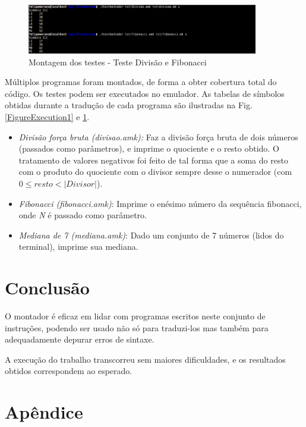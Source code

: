 \documentclass[12pt, a4paper]{article}
\begin{document}
\begin{figure}
\centering
\includegraphics[width=0.9\textwidth]{RuntimeScreencap2.png}
\caption{Montagem dos testes - Teste Divisão e Fibonacci}
\label{FigureExecution2}
\end{figure}

Múltiplos programas foram montados, de forma a obter cobertura total do código. Os testes podem ser executados no emulador. As tabelas de símbolos obtidas durante a tradução de cada programa são ilustradas na Fig. \ref{FigureExecution1} e \ref{FigureExecution2}.

\begin{itemize}
	\item \emph{Divisão força bruta (divisao.amk):} Faz a divisão força bruta de dois números (passados como parâmetros), e imprime o quociente e o resto obtido. O tratamento de valores negativos foi feito de tal forma que a soma do resto com o produto do quociente com o divisor sempre desse o numerador (com $0 \leq resto < |Divisor|$).
	\item \emph{Fibonacci (fibonacci.amk)}: Imprime o enésimo número da sequência fibonacci, onde \emph{N} é passado como parâmetro.
	\item \emph{Mediana de 7 (mediana.amk)}: Dado um conjunto de 7 números (lidos do terminal), imprime sua mediana.
\end{itemize}

\section{Conclusão}

O montador é eficaz em lidar com programas escritos neste conjunto de instruções, podendo ser usado não só para traduzi-los mas também para adequadamente depurar erros de sintaxe.

A execução do trabalho transcorreu sem maiores dificuldades, e os resultados obtidos correspondem ao esperado.

\appendix
\section{Apêndice}
\end{document}
